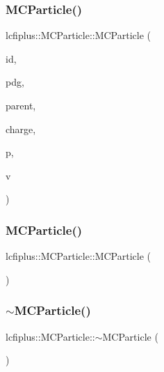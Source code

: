 \subsubsection{M\+C\+Particle()\hspace{0.1cm}{\footnotesize\ttfamily [1/2]}}
{\footnotesize\ttfamily lcfiplus\+::\+M\+C\+Particle\+::\+M\+C\+Particle (\begin{DoxyParamCaption}\item[{int}]{id,  }\item[{int}]{pdg,  }\item[{\textbf{ M\+C\+Particle} $\ast$}]{parent,  }\item[{double}]{charge,  }\item[{const T\+Lorentz\+Vector \&}]{p,  }\item[{const T\+Vector3 \&}]{v }\end{DoxyParamCaption})\hspace{0.3cm}{\ttfamily [inline]}}

\mbox{\label{classlcfiplus_1_1MCParticle_a9de93613c887cc4ddfd18da3d7ad72fb}} 
\subsubsection{M\+C\+Particle()\hspace{0.1cm}{\footnotesize\ttfamily [2/2]}}
{\footnotesize\ttfamily lcfiplus\+::\+M\+C\+Particle\+::\+M\+C\+Particle (\begin{DoxyParamCaption}{ }\end{DoxyParamCaption})\hspace{0.3cm}{\ttfamily [inline]}}

\mbox{\label{classlcfiplus_1_1MCParticle_a72a040dad26b23618dbb31e760fc2516}} 
\subsubsection{$\sim$\+M\+C\+Particle()}
{\footnotesize\ttfamily lcfiplus\+::\+M\+C\+Particle\+::$\sim$\+M\+C\+Particle (\begin{DoxyParamCaption}{ }\end{DoxyParamCaption})\hspace{0.3cm}{\ttfamily [inline]}}



